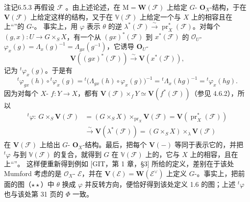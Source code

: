 \begin{SGAresult}{注记}{6.5.3}
再假设 $\mathcal F$ 。由上述论述，在 $\mathrm M=\mathbf W(\mathcal F)$ 上给定 $G$- $\mathbf O_X$-结构，于在 $\mathbf V(\mathcal F)$ 上给定这样的结构，又于在 $\mathbb V(\mathcal F)$ 上给定一个与 $X$ 上的相容且在上“”的 $G$-。
事实上，用 $\varphi$ 表示 $\theta$ 的逆 $\lambda^*(\mathcal F)\xrightarrow\sim\operatorname{pr}_X^*(\mathcal F)$。对每个 $(g,x):U\to G\times_S X$，有一个从 $(gx)^*(\mathcal F)$ 到 $x^*(\mathcal F)$ 的 $\mathcal O_U$- $\varphi_x(g)=\Lambda_x(g)^{-1}=\Lambda_{gx}(g^{-1})$，它诱导 $\mathbf O_U$-
\[
\mathbf V((gx)^*(\mathcal F))\xrightarrow\sim\mathbf V(x^*(\mathcal F)),
\]
记为 ${}^t\varphi_x(g)$。于是有
\[
{}^t\varphi_{gx}(h)\circ{}^t\varphi_x(g)={}^t\bigl(\Lambda_{gx}(h)\circ\varphi_x(g)\bigr)^{-1}={}^t\Lambda_x(hg)^{-1}={}^t\varphi_x(hg).
\]
因为对每个 $X$- $f:Y\to X$，都有 $\mathbf V(\mathcal F)\times_fY\simeq\mathbf V(f^*(\mathcal F))$（参见 4.6.2），所以
\[
\begin{aligned}
{}^t\varphi:\ G\times_S\mathbf V(\mathcal F)&=(G\times_S X)\times_{\operatorname{pr}_X}\mathbf V(\mathcal F)=\mathbf V(\operatorname{pr}_X^*(\mathcal F))\\
&\xrightarrow\sim\mathbf V(\lambda^*(\mathcal F))=(G\times_S X)\times_\lambda\mathbf V(\mathcal F)
\end{aligned}
\]
在 $\mathbf V(\mathcal F)$ 上给出 $G$- $\mathbf O_X$-结构。最后，把每个 $\mathbf V(-)$ 等同于表示它的，并把 ${}^t\varphi$ 与到 $\mathbb V(\mathcal F)$ 的复合，就得到 $G$ 在 $\mathbb V(\mathcal F)$ 上的，它与 $X$ 上的相容，且在上“”。
这样便重新得到例如 [GIT，第 1 章，§3] 所给的定义，差别在于该处 Mumford 考虑的是 $\mathcal O_X$- $\mathcal E$，并在 $\mathbf V(\mathcal E)=\mathbf W(\mathcal E^\vee)$ 上定义 $G$-。事实上，把前面的图（$\star\star$）中 $\theta$ 换成 $\varphi$ 并反转方向，便恰好得到该处定义 1.6 的图；上述 ${}^t\varphi$ 也与该处第 31 页的 $\Phi$ 一致。
\end{SGAresult}
